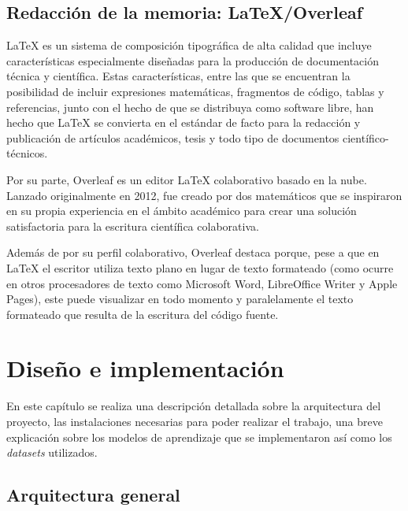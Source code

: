 \documentclass[a4paper, 12pt]{book}
\begin{document}
\section{Redacción de la memoria: LaTeX/Overleaf}
\label{sec:redaccion_de_la_memoria}

LaTeX es un sistema de composición tipográfica de alta calidad que incluye características especialmente diseñadas para la producción de documentación técnica y científica. Estas características, entre las que se encuentran la posibilidad de incluir expresiones matemáticas, fragmentos de código, tablas y referencias, junto con el hecho de que se distribuya como software libre, han hecho que LaTeX se convierta en el estándar de facto para la redacción y publicación de artículos académicos, tesis y todo tipo de documentos científico-técnicos. 

Por su parte, Overleaf es un editor LaTeX colaborativo basado en la nube. Lanzado originalmente en 2012, fue creado por dos matemáticos que se inspiraron en su propia experiencia en el ámbito académico para crear una solución satisfactoria para la escritura científica colaborativa.

Además de por su perfil colaborativo, Overleaf destaca porque, pese a que en LaTeX el escritor utiliza texto plano en lugar de texto formateado (como ocurre en otros procesadores de texto como Microsoft Word, LibreOffice Writer y Apple Pages), este puede visualizar en todo momento y paralelamente el texto formateado que resulta de la escritura del código fuente.

\cleardoublepage


\chapter{Diseño e implementación}
\label{chap:diseño}

En este capítulo se realiza una descripción detallada sobre la arquitectura del proyecto, las instalaciones necesarias para poder realizar el trabajo, una breve explicación sobre los modelos de aprendizaje que se implementaron así como los \textit{datasets} utilizados.

\section{Arquitectura general} 
\label{sec:arquitectura}
\end{document}
